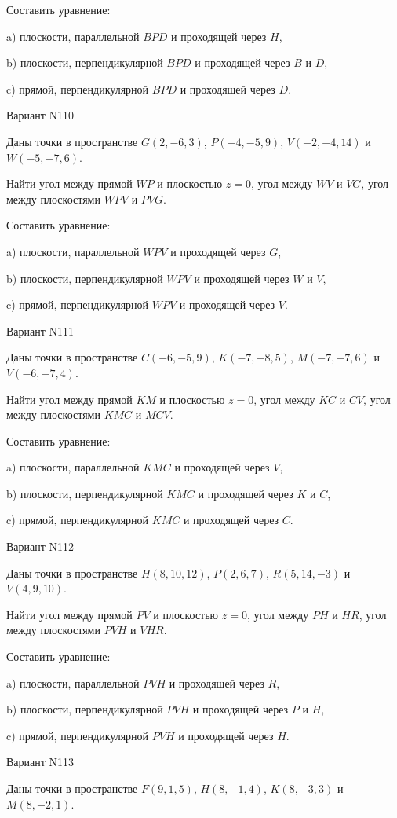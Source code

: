 \documentclass[11pt]{report}
\begin{document}
Составить уравнение: 

a) плоскости, параллельной $BPD$ и проходящей через $H$,

b) плоскости, перпендикулярной $BPD$ и проходящей через $B$ и $D$,

c) прямой, перпендикулярной $BPD$ и проходящей через $D$.

Вариант N110

Даны точки в пространстве
$G(2, -6, 3)$, $P(-4, -5, 9)$, $V(-2, -4, 14)$ и
$W(-5, -7, 6)$.

Найти угол между прямой $WP$ и плоскостью $z = 0$, угол между $WV$ и $VG$, угол между плоскостями $WPV$ 
и $PVG$.

Составить уравнение: 

a) плоскости, параллельной $WPV$ и проходящей через $G$,

b) плоскости, перпендикулярной $WPV$ и проходящей через $W$ и $V$,

c) прямой, перпендикулярной $WPV$ и проходящей через $V$.

Вариант N111

Даны точки в пространстве
$C(-6, -5, 9)$, $K(-7, -8, 5)$, $M(-7, -7, 6)$ и
$V(-6, -7, 4)$.

Найти угол между прямой $KM$ и плоскостью $z = 0$, угол между $KC$ и $CV$, угол между плоскостями $KMC$ 
и $MCV$.

Составить уравнение: 

a) плоскости, параллельной $KMC$ и проходящей через $V$,

b) плоскости, перпендикулярной $KMC$ и проходящей через $K$ и $C$,

c) прямой, перпендикулярной $KMC$ и проходящей через $C$.

Вариант N112

Даны точки в пространстве
$H(8, 10, 12)$, $P(2, 6, 7)$, $R(5, 14, -3)$ и
$V(4, 9, 10)$.

Найти угол между прямой $PV$ и плоскостью $z = 0$, угол между $PH$ и $HR$, угол между плоскостями $PVH$ 
и $VHR$.

Составить уравнение: 

a) плоскости, параллельной $PVH$ и проходящей через $R$,

b) плоскости, перпендикулярной $PVH$ и проходящей через $P$ и $H$,

c) прямой, перпендикулярной $PVH$ и проходящей через $H$.

Вариант N113

Даны точки в пространстве
$F(9, 1, 5)$, $H(8, -1, 4)$, $K(8, -3, 3)$ и
$M(8, -2, 1)$.
\end{document}

